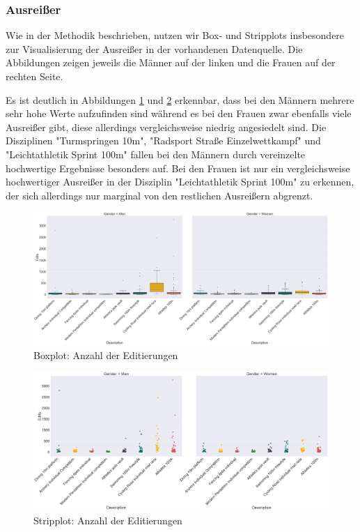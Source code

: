 \documentclass[11pt]{article}
\begin{document}
\subsubsection {Ausreißer}
Wie in der Methodik beschrieben, nutzen wir Box- und Stripplots insbesondere zur Visualisierung der Ausreißer in der vorhandenen Datenquelle. Die Abbildungen zeigen jeweils die Männer auf der linken und die Frauen auf der rechten Seite. 

Es ist deutlich in Abbildungen \ref{fig:editcountBoxPlot} und \ref{fig:editcountStripPlot} erkennbar, dass bei den Männern mehrere sehr hohe Werte aufzufinden sind während es bei den Frauen zwar ebenfalls viele Ausreißer gibt, diese allerdings vergleichsweise niedrig angesiedelt sind. Die Disziplinen "Turmspringen 10m", "Radsport Straße Einzelwettkampf" und  "Leichtathletik Sprint 100m" fallen bei den Männern durch vereinzelte hochwertige Ergebnisse besonders auf. Bei den Frauen ist nur ein vergleichsweise hochwertiger Ausreißer in der Disziplin "Leichtathletik Sprint 100m" zu erkennen, der sich allerdings nur marginal von den restlichen Ausreißern abgrenzt. 

\begin{figure}
\includegraphics[width=1\textwidth]{figures/editcount_boxplot.png}
\caption[Boxplot: Anzahl der Editierungen]{Boxplot: Anzahl der Editierungen}
\label{fig:editcountBoxPlot}
\end{figure}

\begin{figure}
\includegraphics[width=1\textwidth]{figures/editcount_stripplot.png}
\caption[Stripplot: Anzahl der Editierungen]{Stripplot: Anzahl der Editierungen}
\label{fig:editcountStripPlot}
\end{figure}
\end{document}
